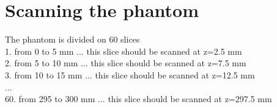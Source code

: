 \documentclass[12pt]{article}
\begin{document}
\section{Scanning the phantom}

The phantom is divided on 60 slices\\
1. from 0 to 5 mm ... this slice should be scanned at z=2.5 mm\\
2. from 5 to 10 mm ... this slice should be scanned at z=7.5 mm\\
3. from 10 to 15 mm ... this slice should be scanned at z=12.5 mm\\
...\\
60. from 295 to 300 mm ... this slice should be scanned at z=297.5 mm\\
\end{document}
